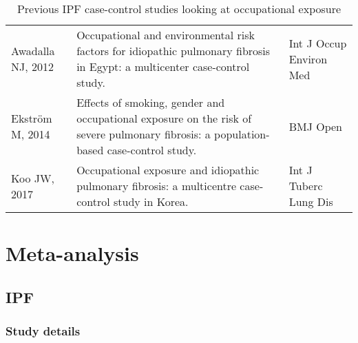 \documentclass[a4
er,12pt]{article}
\begin{document}
\begin{table}
\begin{tabular}{p{5cm}p{7cm}p{3cm}}
                Awadalla NJ, 2012\cite{Awadalla2012} &  Occupational and environmental risk factors for idiopathic pulmonary fibrosis in Egypt: a multicenter case-control study. &     Int J Occup Environ Med \\
                  Ekström M, 2014\cite{Ekstrom2014} &  Effects of smoking, gender and occupational exposure on the risk of severe pulmonary fibrosis: a population-based case-control study. &                    BMJ Open \\ 
                     Koo JW, 2017\cite{Koo2017} &  Occupational exposure and idiopathic pulmonary fibrosis: a multicentre case-control study in Korea. &       Int J Tuberc Lung Dis \\
	\bottomrule
    \end{tabular}
	\caption{Previous IPF case-control studies looking at occupational exposure}
	\label{table:papers}
\end{table}
               

\section{Meta-analysis}

\subsection{IPF}

\subsubsection{Study details}
\end{document}

